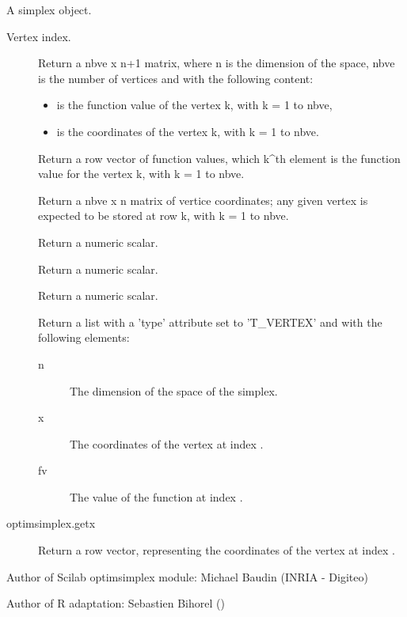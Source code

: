 %
\begin{Arguments}
\begin{ldescription}
\item[\code{this}] A simplex object.
\item[\code{ive}] Vertex index.
\end{ldescription}
\end{Arguments}
%
\begin{Value}
\begin{description}

\item[] Return a nbve x n+1 matrix, where n is the
dimension of the space, nbve is the number of vertices and with the
following content: \begin{itemize}

\item {} is the function value of the vertex k, with k =
1 to nbve,
\item {} is the coordinates of the vertex k, with
k = 1 to nbve.

\end{itemize}


\item[] Return a row vector of function values,
which k\textasciicircum{}th element is the function value for the vertex k, with k = 1 to
nbve.
\item[] Return a nbve x n matrix of vertice
coordinates; any given vertex is expected to be stored at row k, with k =
1 to nbve.
\item[] Return a numeric scalar.
\item[] Return a numeric scalar.
\item[] Return a numeric scalar.
\item[] Return a list with a 'type' attribute set
to 'T\_VERTEX' and with the following elements: \begin{description}

\item[n] The dimension of the space of the simplex.
\item[x] The coordinates of the vertex at index .
\item[fv] The value of the function at index .

\end{description}


\item[optimsimplex.getx] Return a row vector, representing the coordinates
of the vertex at index .


\end{description}

\end{Value}
%
\begin{Author}\relax
Author of Scilab optimsimplex module: Michael Baudin (INRIA - Digiteo)

Author of R adaptation: Sebastien Bihorel ()
\end{Author}
%
\begin{SeeAlso}\relax
{}
\end{SeeAlso}
